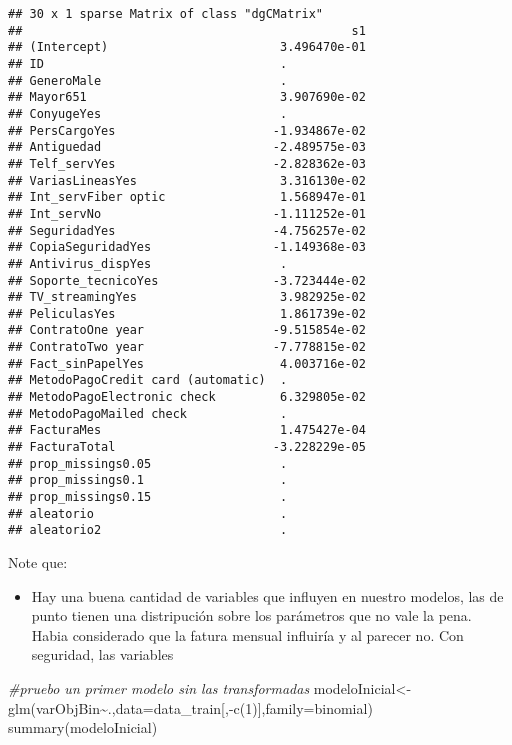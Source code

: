 \documentclass[
]{article}
\newenvironment{Shaded}{\begin{snugshade}}{\end{snugshade}}
\newcommand{\AttributeTok}[1]{\textcolor[rgb]{0.77,0.63,0.00}{#1}}
\newcommand{\CommentTok}[1]{\textcolor[rgb]{0.56,0.35,0.01}{\textit{#1}}}
\newcommand{\DecValTok}[1]{\textcolor[rgb]{0.00,0.00,0.81}{#1}}
\newcommand{\FunctionTok}[1]{\textcolor[rgb]{0.00,0.00,0.00}{#1}}
\newcommand{\NormalTok}[1]{#1}
\newcommand{\OtherTok}[1]{\textcolor[rgb]{0.56,0.35,0.01}{#1}}
\newcommand{\SpecialCharTok}[1]{\textcolor[rgb]{0.00,0.00,0.00}{#1}}
\providecommand{\tightlist}{%
  \setlength{\itemsep}{0pt}\setlength{\parskip}{0pt}}
\begin{document}
\begin{verbatim}
## 30 x 1 sparse Matrix of class "dgCMatrix"
##                                              s1
## (Intercept)                        3.496470e-01
## ID                                 .           
## GeneroMale                         .           
## Mayor651                           3.907690e-02
## ConyugeYes                         .           
## PersCargoYes                      -1.934867e-02
## Antiguedad                        -2.489575e-03
## Telf_servYes                      -2.828362e-03
## VariasLineasYes                    3.316130e-02
## Int_servFiber optic                1.568947e-01
## Int_servNo                        -1.111252e-01
## SeguridadYes                      -4.756257e-02
## CopiaSeguridadYes                 -1.149368e-03
## Antivirus_dispYes                  .           
## Soporte_tecnicoYes                -3.723444e-02
## TV_streamingYes                    3.982925e-02
## PeliculasYes                       1.861739e-02
## ContratoOne year                  -9.515854e-02
## ContratoTwo year                  -7.778815e-02
## Fact_sinPapelYes                   4.003716e-02
## MetodoPagoCredit card (automatic)  .           
## MetodoPagoElectronic check         6.329805e-02
## MetodoPagoMailed check             .           
## FacturaMes                         1.475427e-04
## FacturaTotal                      -3.228229e-05
## prop_missings0.05                  .           
## prop_missings0.1                   .           
## prop_missings0.15                  .           
## aleatorio                          .           
## aleatorio2                         .
\end{verbatim}

Note que:

\begin{itemize}
\tightlist
\item
  Hay una buena cantidad de variables que influyen en nuestro modelos,
  las de punto tienen una distripución sobre los parámetros que no vale
  la pena. Habia considerado que la fatura mensual influiría y al
  parecer no. Con seguridad, las variables
\end{itemize}

\begin{Shaded}
\begin{Highlighting}[]
\CommentTok{\#pruebo un primer modelo sin las transformadas}
\NormalTok{modeloInicial}\OtherTok{\textless{}{-}}\FunctionTok{glm}\NormalTok{(varObjBin}\SpecialCharTok{\textasciitilde{}}\NormalTok{.,}\AttributeTok{data=}\NormalTok{data\_train[,}\SpecialCharTok{{-}}\FunctionTok{c}\NormalTok{(}\DecValTok{1}\NormalTok{)],}\AttributeTok{family=}\NormalTok{binomial)}
\FunctionTok{summary}\NormalTok{(modeloInicial)}
\end{Highlighting}
\end{Shaded}
\end{document}
